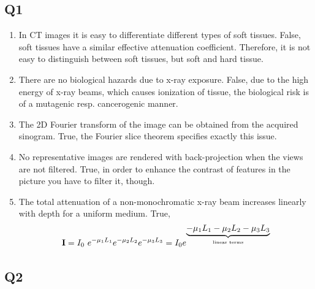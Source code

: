 \subsection*{Q1}
\begin{enumerate}[label=\alph*]
    \item In CT images it is easy to differentiate different types of soft tissues.
    \subitem False, soft tissues have a similar effective attenuation coefficient. Therefore, it is not easy to distinguish between soft tissues, but soft and hard tissue.
    \item There are no biological hazards due to x-ray exposure.
    \subitem False, due to the high energy of x-ray beams, which causes ionization of tissue, the biological risk is of a mutagenic resp. cancerogenic manner.
    \item The 2D Fourier transform of the image can be obtained from the acquired sinogram.
    \subitem True, the Fourier slice theorem specifies exactly this issue.
    \item No representative images are rendered with back-projection when the views are not filtered.
    \subitem True, in order to enhance the contrast of features in the picture you have to filter it, though.
    \item The total attenuation of a non-monochromatic x-ray beam increases linearly with depth for a uniform medium.
    \subitem True,
    \begin{equation}
        \textbf{I} = I_0\ e^{-\mu_1 L_1} e^{-\mu_2 L_2} e^{-\mu_3 L_3} = I_0 e^{\underbrace{-\mu_1 L_1 -\mu_2 L_2- \mu_3 L_3}_{\text{\normalfont linear terms}}}
    \end{equation}    
\end{enumerate}

\subsection*{Q2}
